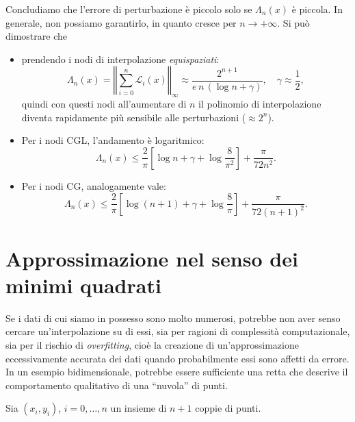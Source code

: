 Concludiamo che l'errore di perturbazione è piccolo solo se $\Lambda_{n}(x)$ è piccola. In generale, non possiamo garantirlo, in quanto cresce per $n\rightarrow +\infty $. Si può dimostrare che
\begin{itemize}
    \item prendendo i nodi di interpolazione \textit{equispaziati}:
        \begin{equation*}
            \Lambda _{n}(x) =\left\Vert \sum ^{n}_{i=0}\mathcal{L}_{i}(x)\right\Vert _{\infty } \approx \frac{2^{n+1}}{e\, n\, (\log n+\gamma )} ,\quad\gamma \approx \frac{1}{2} ,
        \end{equation*}
    quindi con questi nodi all'aumentare di $n$ il polinomio di interpolazione diventa rapidamente più sensibile alle perturbazioni ($\approx 2^n$).
    \item Per i nodi CGL, l'andamento è logaritmico:
    $$\Lambda _{n}(x) \leqslant \frac{2}{\pi }\left[\log n+\gamma +\log\frac{8}{\pi ^{2}}\right] +\frac{\pi }{72n^{2}}.$$
    \item Per i nodi CG, analogamente vale:
    $$\Lambda _{n}(x) \leqslant \frac{2}{\pi }\left[\log( n+1) +\gamma +\log\frac{8}{\pi }\right] +\frac{\pi }{72( n+1)^{2}}.$$
        
\end{itemize}

\section{Approssimazione nel senso dei minimi quadrati}
Se i dati di cui siamo in possesso sono molto numerosi, potrebbe non aver senso cercare un'interpolazione su di essi, sia per ragioni di complessità computazionale, sia per il rischio di \textit{overfitting}, cioè la creazione di un'approssimazione eccessivamente accurata dei dati quando probabilmente essi sono affetti da errore.
In un esempio bidimensionale, potrebbe essere sufficiente una retta che descrive il comportamento qualitativo di una ``nuvola'' di punti.

Sia $( x_{i} ,y_{i})$, $i=0,\dotsc ,n$ un insieme di $n+1$ coppie di punti.


